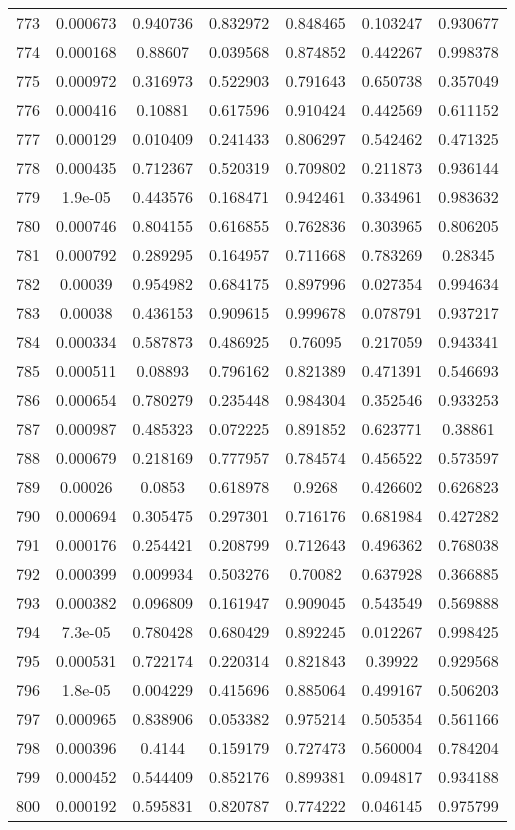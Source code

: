 \begin{table}
\begin{tabular}{c|c|c|c|c|c|c}
773 & 0.000673 & 0.940736 & 0.832972 & 0.848465 & 0.103247 & 0.930677\\
774 & 0.000168 & 0.88607 & 0.039568 & 0.874852 & 0.442267 & 0.998378\\
775 & 0.000972 & 0.316973 & 0.522903 & 0.791643 & 0.650738 & 0.357049\\
776 & 0.000416 & 0.10881 & 0.617596 & 0.910424 & 0.442569 & 0.611152\\
777 & 0.000129 & 0.010409 & 0.241433 & 0.806297 & 0.542462 & 0.471325\\
778 & 0.000435 & 0.712367 & 0.520319 & 0.709802 & 0.211873 & 0.936144\\
779 & 1.9e-05 & 0.443576 & 0.168471 & 0.942461 & 0.334961 & 0.983632\\
780 & 0.000746 & 0.804155 & 0.616855 & 0.762836 & 0.303965 & 0.806205\\
781 & 0.000792 & 0.289295 & 0.164957 & 0.711668 & 0.783269 & 0.28345\\
782 & 0.00039 & 0.954982 & 0.684175 & 0.897996 & 0.027354 & 0.994634\\
783 & 0.00038 & 0.436153 & 0.909615 & 0.999678 & 0.078791 & 0.937217\\
784 & 0.000334 & 0.587873 & 0.486925 & 0.76095 & 0.217059 & 0.943341\\
785 & 0.000511 & 0.08893 & 0.796162 & 0.821389 & 0.471391 & 0.546693\\
786 & 0.000654 & 0.780279 & 0.235448 & 0.984304 & 0.352546 & 0.933253\\
787 & 0.000987 & 0.485323 & 0.072225 & 0.891852 & 0.623771 & 0.38861\\
788 & 0.000679 & 0.218169 & 0.777957 & 0.784574 & 0.456522 & 0.573597\\
789 & 0.00026 & 0.0853 & 0.618978 & 0.9268 & 0.426602 & 0.626823\\
790 & 0.000694 & 0.305475 & 0.297301 & 0.716176 & 0.681984 & 0.427282\\
791 & 0.000176 & 0.254421 & 0.208799 & 0.712643 & 0.496362 & 0.768038\\
792 & 0.000399 & 0.009934 & 0.503276 & 0.70082 & 0.637928 & 0.366885\\
793 & 0.000382 & 0.096809 & 0.161947 & 0.909045 & 0.543549 & 0.569888\\
794 & 7.3e-05 & 0.780428 & 0.680429 & 0.892245 & 0.012267 & 0.998425\\
795 & 0.000531 & 0.722174 & 0.220314 & 0.821843 & 0.39922 & 0.929568\\
796 & 1.8e-05 & 0.004229 & 0.415696 & 0.885064 & 0.499167 & 0.506203\\
797 & 0.000965 & 0.838906 & 0.053382 & 0.975214 & 0.505354 & 0.561166\\
798 & 0.000396 & 0.4144 & 0.159179 & 0.727473 & 0.560004 & 0.784204\\
799 & 0.000452 & 0.544409 & 0.852176 & 0.899381 & 0.094817 & 0.934188\\
800 & 0.000192 & 0.595831 & 0.820787 & 0.774222 & 0.046145 & 0.975799\\
\end{tabular}
\end{table}
